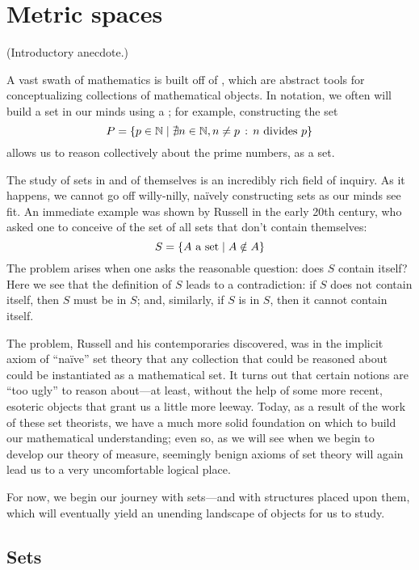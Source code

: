 

\chapter{Metric spaces}

(Introductory anecdote.)

A vast swath of mathematics is built off of , which are abstract tools for conceptualizing collections of mathematical objects. In notation, we often will build a set in our minds using a ; for example, constructing the set
\[ P = \left\{ p \in \mathbb{N} \mid \nexists n \in \mathbb{N}, n \neq p \,:\, n \textrm{ divides } p \right\} \]
allows us to reason collectively about the prime numbers, as a set.

The study of sets in and of themselves is an incredibly rich field of inquiry. As it happens, we cannot go off willy-nilly, naïvely constructing sets as our minds see fit. An immediate example was shown by Russell in the early 20th century, who asked one to conceive of the set of all sets that don't contain themselves:
\[ S = \left\{ A \textrm{ a set} \mid A \notin A \right\} \]
The problem arises when one asks the reasonable question: does $S$ contain itself? Here we see that the definition of $S$ leads to a contradiction: if $S$ does not contain itself, then $S$ must be in $S$; and, similarly, if $S$ is in $S$, then it cannot contain itself.

The problem, Russell and his contemporaries discovered, was in the implicit axiom of ``naïve'' set theory that any collection that could be reasoned about could be instantiated as a mathematical set. It turns out that certain notions are ``too ugly'' to reason about---at least, without the help of some more recent, esoteric objects that grant us a little more leeway. Today, as a result of the work of these set theorists, we have a much more solid foundation on which to build our mathematical understanding; even so, as we will see when we begin to develop our theory of measure, seemingly benign axioms of set theory will again lead us to a very uncomfortable logical place.

For now, we begin our journey with sets---and with structures placed upon them, which will eventually yield an unending landscape of objects for us to study.

\section{Sets}

